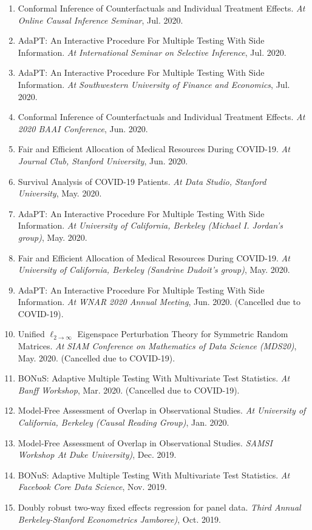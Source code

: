 \documentclass{article}
\begin{document}
\begin{enumerate}
\item Conformal Inference of Counterfactuals and Individual Treatment Effects. \emph{At Online Causal Inference Seminar}, Jul. 2020.
\item AdaPT: An Interactive Procedure For Multiple Testing With Side Information. \emph{At International Seminar on Selective Inference}, Jul. 2020. 
\item AdaPT: An Interactive Procedure For Multiple Testing With Side Information. \emph{At Southwestern University of Finance and Economics}, Jul. 2020. 
\item Conformal Inference of Counterfactuals and Individual Treatment Effects. \emph{At 2020 BAAI Conference}, Jun. 2020. 
\item Fair and Efficient Allocation of Medical Resources During COVID-19. \emph{At Journal Club, Stanford University}, Jun. 2020.
\item Survival Analysis of COVID-19 Patients. \emph{At Data Studio, Stanford University}, May. 2020.
\item AdaPT: An Interactive Procedure For Multiple Testing With Side Information. \emph{At University of California, Berkeley (Michael I. Jordan's group)}, May. 2020. 
\item Fair and Efficient Allocation of Medical Resources During COVID-19. \emph{At University of California, Berkeley (Sandrine Dudoit's group)}, May. 2020. 
\item AdaPT: An Interactive Procedure For Multiple Testing With Side Information. \emph{At WNAR 2020 Annual Meeting}, Jun. 2020. (Cancelled due to COVID-19).
\item Unified $\ell_{2\rightarrow\infty}$ Eigenspace Perturbation Theory for Symmetric Random Matrices. \emph{At SIAM Conference on Mathematics of Data Science (MDS20)}, May. 2020. (Cancelled due to COVID-19).
\item BONuS: Adaptive Multiple Testing With Multivariate Test Statistics. \emph{At Banff Workshop}, Mar. 2020. (Cancelled due to COVID-19).
\item Model-Free Assessment of Overlap in Observational Studies. \emph{At University of California, Berkeley (Causal Reading Group)}, Jan. 2020.
\item Model-Free Assessment of Overlap in Observational Studies. \emph{SAMSI Workshop At Duke University)}, Dec. 2019.
\item BONuS: Adaptive Multiple Testing With Multivariate Test Statistics. \emph{At Facebook Core Data Science}, Nov. 2019.
\item Doubly robust two-way fixed effects regression for panel data. \emph{Third Annual Berkeley-Stanford Econometrics Jamboree)}, Oct. 2019.

\end{enumerate}
\end{document}
